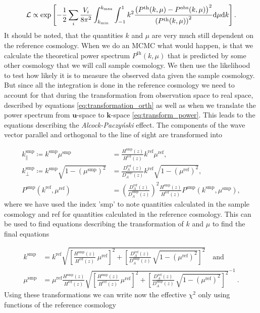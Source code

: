 \documentclass[../main.tex]{subfiles}
\begin{document}
 \begin{equation}
    \mathcal{L} \propto \exp\left[-\frac{1}{2} \sum_i \frac{V_i}{8 \pi^2} \int_{k_\mathrm{min}}^{k_\mathrm{max}} \int_{-1}^{1} k^2 \frac{\left(P^\mathrm{th}(k,\mu)-P^\mathrm{obs}(k,\mu)\right)^2}{\left(P^\mathrm{th}(k,\mu)\right)^2} \mathrm{d} \mu \mathrm{d} k \right]. 
 \end{equation}
 It should be noted, that the quantities $k$ and $\mu$ are very much still dependent on the reference cosmology. When we do an MCMC what would happen, is that we calculate the theoretical power spectrum $P^\mathrm{th}(k,\mu)$ that is predicted by some other cosmology that we will call sample cosmology. We then use the likelihood to test how likely it is to measure the observed data given the sample cosmology. But since all the integration is done in the reference cosmology we need to account for that during the transformation from observation space to real space, described by equations \ref{eq:transformation_orth} as well as when we translate the power spectrum from $\boldsymbol{u}$-space to $\boldsymbol{k}$-space \ref{eq:transform_power}. This leads to the equations describing the \textit{Alcock-Paczyński} effect. The components of the wave vector parallel and orthogonal to the line of sight are transformed into
 
 \begin{align}
    k_\|^\mathrm{smp} \coloneq k^\mathrm{smp} \mu^\mathrm{smp} &= \frac{H^\mathrm{smp}(z)}{H^\mathrm{ref}(z)} k^\mathrm{ref} \mu^\mathrm{ref}, \nonumber\\
    k_\perp^\mathrm{smp} \coloneq k^\mathrm{smp} \sqrt{1-\left(\mu^\mathrm{smp}\right)^2} &= \frac{D^\mathrm{ref}_A(z)}{D^\mathrm{smp}_A(z)} k^\mathrm{ref} \sqrt{1-\left(\mu^\mathrm{ref}\right)^2}, \nonumber\\
    P^\mathrm{smp}(k^\mathrm{ref},\mu^\mathrm{ref}) &= \left(\frac{D^\mathrm{ref}_A(z)}{D^\mathrm{smp}_A(z)} \right)^2 \frac{H^\mathrm{smp}(z)}{H^\mathrm{ref}(z)} P^\mathrm{smp}(k^\mathrm{smp},\mu^\mathrm{smp}),\label{eq:Alcock-Paczynski}
 \end{align}
where we have used the index 'smp' to note quantities calculated in the sample cosmology and ref for quantities calculated in the reference cosmology. This can be used to find equations describing the transformation of $k$ and $\mu$ to find the final equations

\begin{align}
    k^\mathrm{smp} &= k^\mathrm{ref} \sqrt{\left[\frac{H^\mathrm{smp}(z)}{H^\mathrm{ref}(z)} \, \mu^\mathrm{ref} \right]^2 + \left[ \frac{D^\mathrm{ref}_A(z)}{D^\mathrm{smp}_A(z)} \, \sqrt{1-\left(\mu^\mathrm{ref}\right)^2} \right]^2 } \quad \text{and} \nonumber\\
    \mu^\mathrm{smp} &= \mu^\mathrm{ref} \frac{H^\mathrm{smp}(z)}{H^\mathrm{ref}(z)} \sqrt{\left[\frac{H^\mathrm{smp}(z)}{H^\mathrm{ref}(z)} \, \mu^\mathrm{ref} \right]^2 + \left[ \frac{D^\mathrm{ref}_A(z)}{D^\mathrm{smp}_A(z)} \, \sqrt{1-\left(\mu^\mathrm{ref}\right)^2} \right]^2 }^{-1}\:. \label{eq:observed_kmu}
\end{align}
Using these transformations we can write now the effective $\chi^2$ only using functions of the reference cosmology
\end{document}
